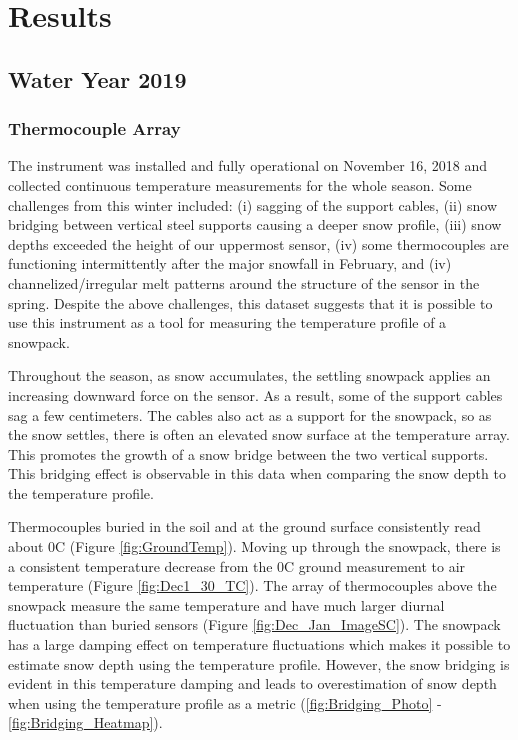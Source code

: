 \chapter{Results}
\section{Water Year 2019} 
\subsection{Thermocouple Array}
The instrument was installed and fully operational on November 16, 2018 and collected continuous temperature measurements for the whole season. Some challenges from this winter included: (i) sagging of the support cables, (ii) snow bridging between vertical steel supports causing a deeper snow profile, (iii) snow depths exceeded the height of our uppermost sensor, (iv) some thermocouples are functioning intermittently after the major snowfall in February, and (iv) channelized/irregular melt patterns around the structure of the sensor in the spring. Despite the above challenges, this dataset suggests that it is possible to use this instrument as a tool for measuring the temperature profile of a snowpack. 

Throughout the season, as snow accumulates, the settling snowpack applies an increasing downward force on the sensor. As a result, some of the support cables sag a few centimeters. The cables also act as a support for the snowpack, so as the snow settles, there is often an elevated snow surface at the temperature array. This promotes the growth of a snow bridge between the two vertical supports. This bridging effect is observable in this data when comparing the snow depth to the temperature profile.   

Thermocouples buried in the soil and at the ground surface consistently read about 0\textdegree C (Figure \ref{fig:GroundTemp}). Moving up through the snowpack, there is a consistent temperature decrease from the 0\textdegree C ground measurement to air temperature (Figure \ref{fig:Dec1_30_TC}). The array of thermocouples above the snowpack measure the same temperature and have much larger diurnal fluctuation than buried sensors (Figure \ref{fig:Dec_Jan_ImageSC}). The snowpack has a large damping effect on temperature fluctuations which makes it possible to estimate snow depth using the temperature profile. However, the snow bridging is evident in this temperature damping and leads to overestimation of snow depth when using the temperature profile as a metric (\ref{fig:Bridging_Photo} - \ref{fig:Bridging_Heatmap}). 

